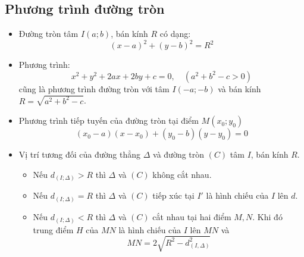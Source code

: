 \subsection{Phương trình đường tròn}
\begin{itemize}
\item Đường tròn tâm $I(a; b)$, bán kính $R$ có dạng:
\begin{equation}
(x-a)^2 + (y-b)^2 = R^2
\end{equation}
\item Phương trình:
\begin{equation} \label{dtrtq}
x^2 + y^2 + 2ax + 2by + c = 0, \quad (a^2 + b^2-c > 0)
\end{equation}
cũng là phương trình đường tròn với tâm $I(- a ;-b)$ và bán kính $R=\sqrt{a^2+b^2-c}$.
\item Phương trình tiếp tuyến của đường tròn tại điểm $M(x_0 ; y_0)$
\begin{equation}
(x_0-a)(x-x_0) + (y_0-b)(y-y_0) = 0
\end{equation}
\item Vị trí tương đối của đường thẳng $\Delta$ và đường tròn $\left(C\right)$ tâm $I$, bán kính $R$.
\begin{itemize}
\item Nếu $d_{(I;\Delta)} > R$ thì $\Delta$ và $\left(C\right)$ không cắt nhau.
\item Nếu $d_{(I;\Delta)} = R$ thì $\Delta$ và $\left(C\right)$ tiếp xúc tại $I'$ là hình chiếu của $I$ lên $d$.
\item Nếu $d_{(I;\Delta)} < R$ thì $\Delta$ và $\left(C\right)$ cắt nhau tại hai điểm $M,N$. Khi đó trung điểm $H$ của $MN$ là hình chiếu của $I$ lên $MN$ và 
\begin{equation}
MN= 2\sqrt{R^2-d^2_{(I,\Delta)}}
\end{equation}
\end{itemize}
\end{itemize} 
